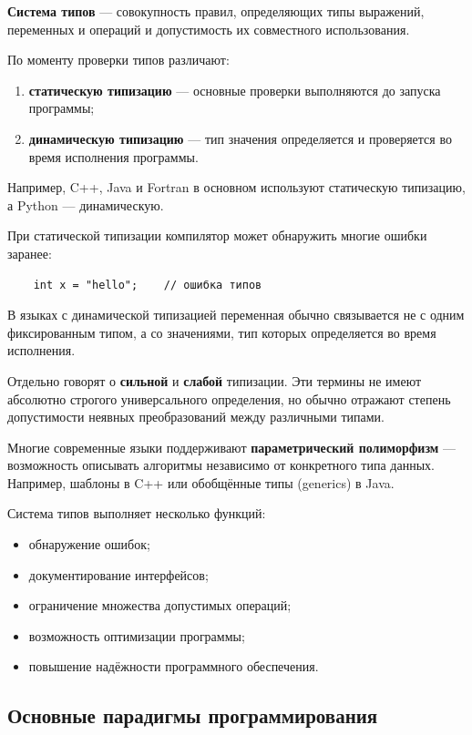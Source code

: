 \textbf{Система типов} --- совокупность правил, определяющих типы выражений,
переменных и операций и допустимость их совместного использования.

По моменту проверки типов различают:

\begin{enumerate}
	\item \textbf{статическую типизацию} --- основные проверки выполняются
	до запуска программы;
	
	\item \textbf{динамическую типизацию} --- тип значения определяется и
	проверяется во время исполнения программы.
\end{enumerate}

Например, C++, Java и Fortran в основном используют статическую типизацию,
а Python --- динамическую.

При статической типизации компилятор может обнаружить многие ошибки заранее:

\begin{verbatim}
	int x = "hello";    // ошибка типов
\end{verbatim}

В языках с динамической типизацией переменная обычно связывается не с одним
фиксированным типом, а со значениями, тип которых определяется во время
исполнения.

Отдельно говорят о \textbf{сильной} и \textbf{слабой} типизации. Эти термины
не имеют абсолютно строгого универсального определения, но обычно отражают
степень допустимости неявных преобразований между различными типами.

Многие современные языки поддерживают \textbf{параметрический полиморфизм}
--- возможность описывать алгоритмы независимо от конкретного типа данных.
Например, шаблоны в C++ или обобщённые типы (generics) в Java.

Система типов выполняет несколько функций:

\begin{itemize}
	\item обнаружение ошибок;
	\item документирование интерфейсов;
	\item ограничение множества допустимых операций;
	\item возможность оптимизации программы;
	\item повышение надёжности программного обеспечения.
\end{itemize}

\subsection{Основные парадигмы программирования}


